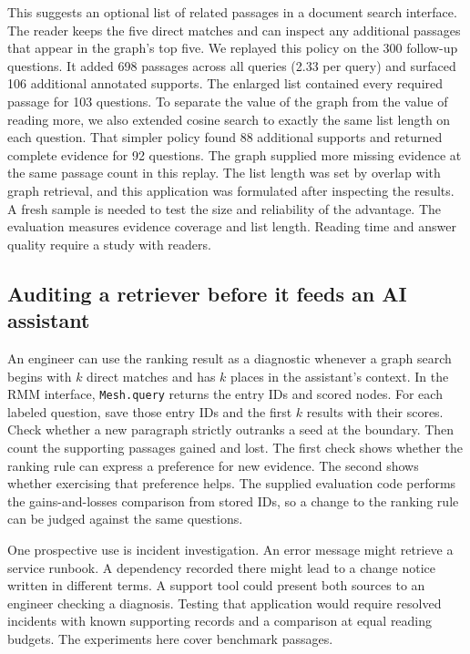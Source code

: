\documentclass[11pt,a4paper]{article}
\begin{document}
This suggests an optional list of related passages in a document search interface. The reader keeps the five direct matches and can inspect any additional passages that appear in the graph's top five. We replayed this policy on the 300 follow-up questions. It added 698 passages across all queries (2.33 per query) and surfaced 106 additional annotated supports. The enlarged list contained every required passage for 103 questions. To separate the value of the graph from the value of reading more, we also extended cosine search to exactly the same list length on each question. That simpler policy found 88 additional supports and returned complete evidence for 92 questions. The graph supplied more missing evidence at the same passage count in this replay. The list length was set by overlap with graph retrieval, and this application was formulated after inspecting the results. A fresh sample is needed to test the size and reliability of the advantage. The evaluation measures evidence coverage and list length. Reading time and answer quality require a study with readers.

\subsection*{Auditing a retriever before it feeds an AI assistant}
An engineer can use the ranking result as a diagnostic whenever a graph search begins with $k$ direct matches and has $k$ places in the assistant's context. In the RMM interface, \texttt{Mesh.query} returns the entry IDs and scored nodes. For each labeled question, save those entry IDs and the first $k$ results with their scores. Check whether a new paragraph strictly outranks a seed at the boundary. Then count the supporting passages gained and lost. The first check shows whether the ranking rule can express a preference for new evidence. The second shows whether exercising that preference helps. The supplied evaluation code performs the gains-and-losses comparison from stored IDs, so a change to the ranking rule can be judged against the same questions.

One prospective use is incident investigation. An error message might retrieve a service runbook. A dependency recorded there might lead to a change notice written in different terms. A support tool could present both sources to an engineer checking a diagnosis. Testing that application would require resolved incidents with known supporting records and a comparison at equal reading budgets. The experiments here cover benchmark passages.
\end{document}
